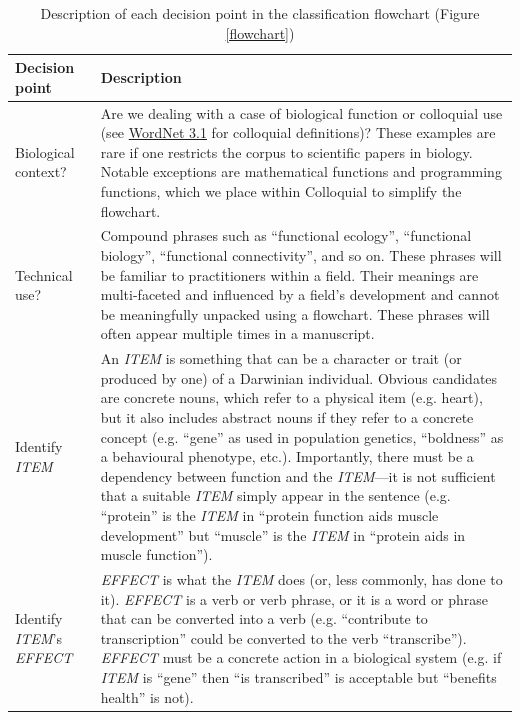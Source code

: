 \documentclass{article}
\begin{document}
\begin{landscape}
  \begin{table}
    \small
    \caption{Description of each decision point in the classification flowchart (Figure \ref{flowchart})}
  \begin{tabular}{|p{0.17\linewidth}|p{0.97\linewidth}|}
    \hline
    Decision point & Description \\
    \hline
    Biological context? & Are we dealing with a case of biological function or colloquial use (see \href{http://wordnetweb.princeton.edu/perl/webwn?s=function&sub=Search+WordNet&o2=&o0=1&o8=1&o1=1&o7=&o5=&o9=&o6=&o3=&o4=&h=}{WordNet 3.1} for colloquial definitions)? These examples are rare if one restricts the corpus to scientific papers in biology. Notable exceptions are mathematical functions and programming functions, which we place within Colloquial to simplify the flowchart. \\
    \hline
    Technical use? & Compound phrases such as ``functional ecology'', ``functional biology'', ``functional connectivity'', and so on. These phrases will be familiar to practitioners within a field. Their meanings are multi-faceted and influenced by a field's development and cannot be meaningfully unpacked using a flowchart.  These phrases will often appear multiple times in a manuscript. \\
    \hline
    Identify \emph{ITEM} &  An \emph{ITEM} is something that can be a character or trait (or produced by one) of a Darwinian individual. Obvious candidates are concrete nouns, which refer to a physical item (e.g. heart), but it also includes abstract nouns if they refer to a concrete concept (e.g. ``gene'' as used in population genetics, ``boldness'' as a behavioural phenotype, etc.). Importantly, there must be a dependency between function and the \emph{ITEM}---it is not sufficient that a suitable \emph{ITEM} simply appear in the sentence (e.g. ``protein'' is the \emph{ITEM} in  ``protein function aids muscle development'' but ``muscle'' is the \emph{ITEM} in ``protein aids in muscle function''). \\
    \hline
    Identify \emph{ITEM}'s \emph{EFFECT} & \emph{EFFECT} is what the \emph{ITEM} does (or, less commonly, has done to it). \emph{EFFECT} is a verb or verb phrase, or it is a word or phrase that can be converted into a verb (e.g. ``contribute to transcription'' could be converted to the verb ``transcribe''). \emph{EFFECT} must be a concrete action in a biological system (e.g. if \emph{ITEM} is ``gene'' then ``is transcribed'' is acceptable but ``benefits health'' is not). \\

\end{tabular}
\end{table}
\end{landscape}
\end{document}
